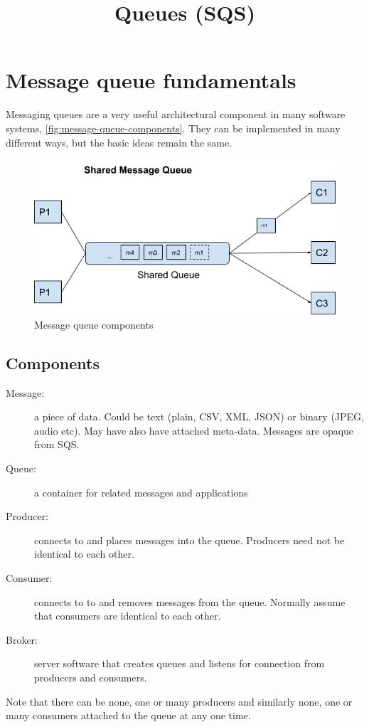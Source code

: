 \documentclass{pgnotes}
\title{Queues (SQS)}
\begin{document}
\maketitle

\section{Message queue fundamentals}

Messaging queues are a very useful architectural component in many software systems, \autoref{fig:message-queue-components}.
They can be implemented in many different ways, but the basic ideas remain the same.

\begin{figure}[htbp]
  \centering
  \includegraphics{shared_message_queue}
  \caption{Message queue components}
  \label{fig:message-queue-components}
\end{figure}

\subsection{Components}

\begin{description}
\item[Message:] a piece of data.  Could be text (plain, CSV, XML, JSON) or binary (JPEG, audio etc). May have also have attached meta-data. Messages are opaque from SQS.
\item[Queue:] a container for related messages and applications
\item[Producer:] connects to and places messages into the queue. Producers need not be identical to each other.
\item[Consumer:] connects to to and removes messages from the queue. Normally assume that consumers are identical to each other.
\item[Broker:] server software that creates queues and listens for connection from producers and consumers.
\end{description}
Note that there can be none, one or many producers and similarly none, one or many consumers attached to the queue at any one time. 
\end{document}

